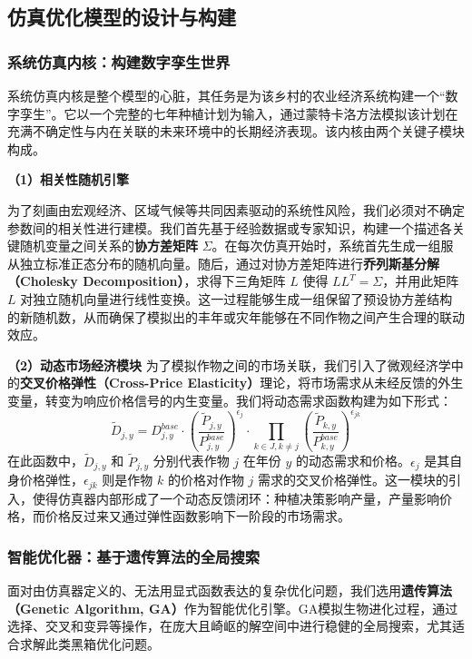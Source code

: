 \documentclass[withoutpreface,bwprint]{cumcmthesis} %
\begin{document}
\subsection{仿真优化模型的设计与构建}

\subsubsection{系统仿真内核：构建数字孪生世界}

系统仿真内核是整个模型的心脏，其任务是为该乡村的农业经济系统构建一个“数字孪生”。它以一个完整的七年种植计划为输入，通过蒙特卡洛方法模拟该计划在充满不确定性与内在关联的未来环境中的长期经济表现。该内核由两个关键子模块构成。

\textbf{（1）相关性随机引擎}

为了刻画由宏观经济、区域气候等共同因素驱动的系统性风险，我们必须对不确定参数间的相关性进行建模。我们首先基于经验数据或专家知识，构建一个描述各关键随机变量之间关系的\textbf{协方差矩阵} $\Sigma$。在每次仿真开始时，系统首先生成一组服从独立标准正态分布的随机向量。随后，通过对协方差矩阵进行\textbf{乔列斯基分解（Cholesky Decomposition）}，求得下三角矩阵 $L$ 使得 $LL^T = \Sigma$，并用此矩阵 $L$ 对独立随机向量进行线性变换。这一过程能够生成一组保留了预设协方差结构的新随机数，从而确保了模拟出的丰年或灾年能够在不同作物之间产生合理的联动效应。

\textbf{（2）动态市场经济模块}
为了模拟作物之间的市场关联，我们引入了微观经济学中的\textbf{交叉价格弹性（Cross-Price Elasticity）}理论，将市场需求从未经反馈的外生变量，转变为响应价格信号的内生变量。我们将动态需求函数构建为如下形式：
\begin{equation}
\tilde{D}_{j,y} = D_{j,y}^{base} \cdot \left(\frac{\tilde{P}_{j,y}}{P_{j,y}^{base}}\right)^{\epsilon_j} \cdot \prod_{k \in J, k \neq j} \left(\frac{\tilde{P}_{k,y}}{P_{k,y}^{base}}\right)^{\epsilon_{jk}}
\end{equation}
在此函数中，$\tilde{D}_{j,y}$ 和 $\tilde{P}_{j,y}$ 分别代表作物 $j$ 在年份 $y$ 的动态需求和价格。$\epsilon_j$ 是其自身价格弹性，$\epsilon_{jk}$ 则是作物 $k$ 的价格对作物 $j$ 需求的交叉价格弹性。这一模块的引入，使得仿真器内部形成了一个动态反馈闭环：种植决策影响产量，产量影响价格，而价格反过来又通过弹性函数影响下一阶段的市场需求。

\subsubsection{智能优化器：基于遗传算法的全局搜索}

面对由仿真器定义的、无法用显式函数表达的复杂优化问题，我们选用\textbf{遗传算法（Genetic Algorithm, GA）}作为智能优化引擎。GA模拟生物进化过程，通过选择、交叉和变异等操作，在庞大且崎岖的解空间中进行稳健的全局搜索，尤其适合求解此类黑箱优化问题。
\end{document}
